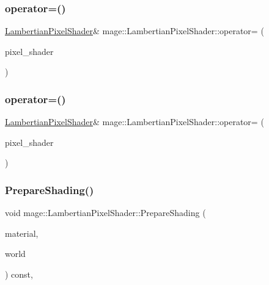 \subsubsection{\texorpdfstring{operator=()}{operator=()}\hspace{0.1cm}{\footnotesize\ttfamily [1/2]}}
{\footnotesize\ttfamily \hyperlink{classmage_1_1_lambertian_pixel_shader}{Lambertian\+Pixel\+Shader}\& mage\+::\+Lambertian\+Pixel\+Shader\+::operator= (\begin{DoxyParamCaption}\item[{const \hyperlink{classmage_1_1_lambertian_pixel_shader}{Lambertian\+Pixel\+Shader} \&}]{pixel\+\_\+shader }\end{DoxyParamCaption})\hspace{0.3cm}{\ttfamily [delete]}}

\hypertarget{classmage_1_1_lambertian_pixel_shader_af3fd77b32ff54a932b9c8734446cd5bd}{}\label{classmage_1_1_lambertian_pixel_shader_af3fd77b32ff54a932b9c8734446cd5bd} 
\subsubsection{\texorpdfstring{operator=()}{operator=()}\hspace{0.1cm}{\footnotesize\ttfamily [2/2]}}
{\footnotesize\ttfamily \hyperlink{classmage_1_1_lambertian_pixel_shader}{Lambertian\+Pixel\+Shader}\& mage\+::\+Lambertian\+Pixel\+Shader\+::operator= (\begin{DoxyParamCaption}\item[{\hyperlink{classmage_1_1_lambertian_pixel_shader}{Lambertian\+Pixel\+Shader} \&\&}]{pixel\+\_\+shader }\end{DoxyParamCaption})\hspace{0.3cm}{\ttfamily [delete]}}

\hypertarget{classmage_1_1_lambertian_pixel_shader_aa7fe16f197ee09c60f6416f1d5178671}{}\label{classmage_1_1_lambertian_pixel_shader_aa7fe16f197ee09c60f6416f1d5178671} 
\subsubsection{\texorpdfstring{Prepare\+Shading()}{PrepareShading()}}
{\footnotesize\ttfamily void mage\+::\+Lambertian\+Pixel\+Shader\+::\+Prepare\+Shading (\begin{DoxyParamCaption}\item[{const \hyperlink{structmage_1_1_material}{Material} \&}]{material,  }\item[{const \hyperlink{classmage_1_1_world}{World} \&}]{world }\end{DoxyParamCaption}) const\hspace{0.3cm}{\ttfamily [override]}, {\ttfamily [virtual]}}



